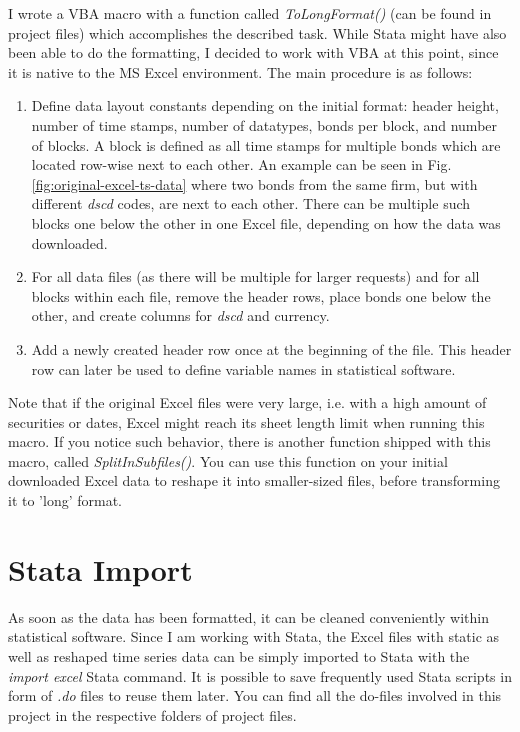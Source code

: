 I wrote a VBA macro with a function called \textit{ToLongFormat()} (can be found in project files) which accomplishes the described task. While Stata might have also been able to do the formatting, I decided to work with VBA at this point, since it is native to the MS Excel environment. The main procedure is as follows: 
\begin{enumerate}
	\item Define data layout constants depending on the initial format: header height, number of time stamps, number of datatypes, bonds per block, and number of blocks. A block is defined as all time stamps for multiple bonds which are located row-wise next to each other. An example can be seen in Fig. \ref{fig:original-excel-ts-data} where two bonds from the same firm, but with different \textit{dscd} codes, are next to each other. There can be multiple such blocks one below the other in one Excel file, depending on how the data was downloaded. 
	\item For all data files (as there will be multiple for larger requests) and for all blocks within each file, remove the header rows, place bonds one below the other, and create columns for \textit{dscd} and currency. 
	\item Add a newly created header row once at the beginning of the file. This header row can later be used to define variable names in statistical software. 
\end{enumerate}

Note that if the original Excel files were very large, i.e. with a high amount of securities or dates, Excel might reach its sheet length limit when running this macro. If you notice such behavior, there is another function shipped with this macro, called \textit{SplitInSubfiles()}. You can use this function on your initial downloaded Excel data to reshape it into smaller-sized files, before transforming it to 'long' format. 

\section{Stata Import} \label{section:data-cleaning}
As soon as the data has been formatted, it can be cleaned conveniently within statistical software. Since I am working with Stata, the Excel files with static as well as reshaped time series data can be simply imported to Stata with the \textit{import excel} Stata command. It is possible to save frequently used Stata scripts in form of \textit{.do} files to reuse them later. You can find all the do-files involved in this project in the respective folders of project files. 

